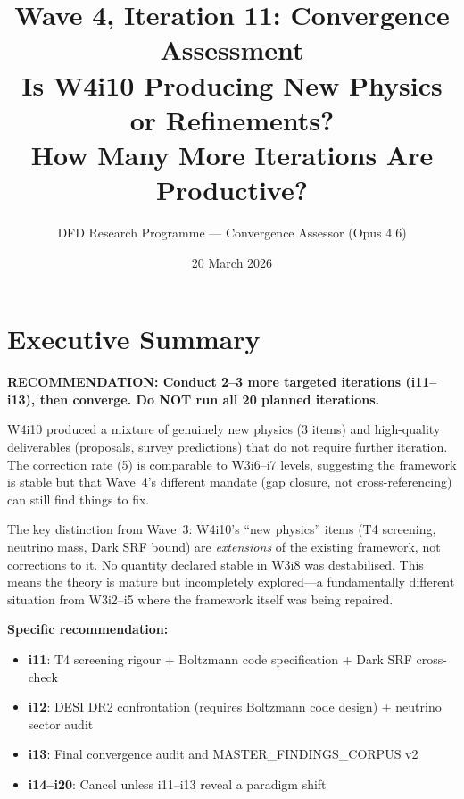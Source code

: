 \documentclass[11pt]{article}
\title{Wave 4, Iteration 11: Convergence Assessment\\
\large Is W4i10 Producing New Physics or Refinements?\\
How Many More Iterations Are Productive?}
\author{DFD Research Programme --- Convergence Assessor (Opus 4.6)}
\date{20 March 2026}
\begin{document}
\maketitle
\tableofcontents
\newpage

\section{Executive Summary}
\label{sec:executive}

\begin{tcolorbox}[colback=yellow!5!white, colframe=red!70!black,
  title=\textbf{CONVERGENCE ASSESSMENT --- BOTTOM LINE}]

\textbf{RECOMMENDATION: Conduct 2--3 more targeted iterations (i11--i13),
then converge. Do NOT run all 20 planned iterations.}

W4i10 produced a mixture of genuinely new physics (3 items) and
high-quality deliverables (proposals, survey predictions) that do not
require further iteration. The correction rate (5) is comparable to
W3i6--i7 levels, suggesting the framework is stable but that Wave~4's
different mandate (gap closure, not cross-referencing) can still find
things to fix.

The key distinction from Wave~3: W4i10's ``new physics'' items
(T4 screening, neutrino mass, Dark SRF bound) are \emph{extensions}
of the existing framework, not corrections to it. No quantity declared
stable in W3i8 was destabilised. This means the theory is mature but
incompletely explored---a fundamentally different situation from W3i2--i5
where the framework itself was being repaired.

\medskip
\noindent\textbf{Specific recommendation:}
\begin{itemize}[nosep]
\item \textbf{i11}: T4 screening rigour + Boltzmann code specification + Dark SRF cross-check
\item \textbf{i12}: DESI DR2 confrontation (requires Boltzmann code design) + neutrino sector audit
\item \textbf{i13}: Final convergence audit and MASTER\_FINDINGS\_CORPUS v2
\item \textbf{i14--i20}: Cancel unless i11--i13 reveal a paradigm shift
\end{itemize}
\end{tcolorbox}
\end{document}
